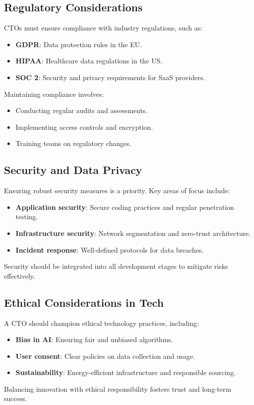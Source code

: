\subsection{Regulatory Considerations}
CTOs must ensure compliance with industry regulations, such as:

\begin{itemize}
    \item \textbf{GDPR}: Data protection rules in the EU.
    \item \textbf{HIPAA}: Healthcare data regulations in the US.
    \item \textbf{SOC 2}: Security and privacy requirements for SaaS providers.
\end{itemize}

Maintaining compliance involves:
\begin{itemize}
    \item Conducting regular audits and assessments.
    \item Implementing access controls and encryption.
    \item Training teams on regulatory changes.
\end{itemize}

\subsection{Security and Data Privacy}
Ensuring robust security measures is a priority. Key areas of focus include:

\begin{itemize}
    \item \textbf{Application security}: Secure coding practices and regular penetration testing.
    \item \textbf{Infrastructure security}: Network segmentation and zero-trust architecture.
    \item \textbf{Incident response}: Well-defined protocols for data breaches.
\end{itemize}

Security should be integrated into all development stages to mitigate risks effectively.

\subsection{Ethical Considerations in Tech}
A CTO should champion ethical technology practices, including:

\begin{itemize}
    \item \textbf{Bias in AI}: Ensuring fair and unbiased algorithms.
    \item \textbf{User consent}: Clear policies on data collection and usage.
    \item \textbf{Sustainability}: Energy-efficient infrastructure and responsible sourcing.
\end{itemize}

Balancing innovation with ethical responsibility fosters trust and long-term success.
